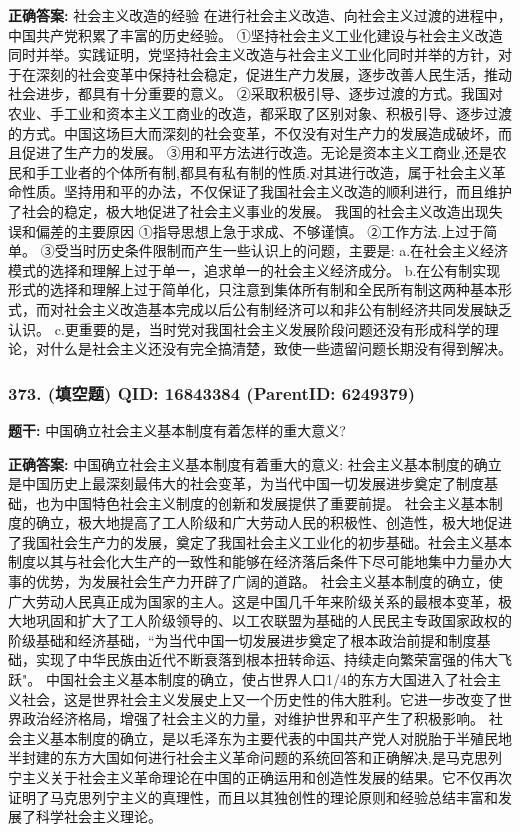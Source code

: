 \documentclass[12pt,UTF8]{ctexart}
\begin{document}
\textbf{正确答案:}
社会主义改造的经验
在进行社会主义改造、向社会主义过渡的进程中，中国共产党积累了丰富的历史经验。
①坚持社会主义工业化建设与社会主义改造同时并举。实践证明，党坚持社会主义改造与社会主义工业化同时并举的方针，对于在深刻的社会变革中保持社会稳定，促进生产力发展，逐步改善人民生活，推动社会进步，都具有十分重要的意义。
②采取积极引导、逐步过渡的方式。我国对农业、手工业和资本主义工商业的改造，都采取了区别对象、积极引导、逐步过渡的方式。中国这场巨大而深刻的社会变革，不仅没有对生产力的发展造成破坏，而且促进了生产力的发展。
③用和平方法进行改造。无论是资本主义工商业,还是农民和手工业者的个体所有制,都具有私有制的性质.对其进行改造，属于社会主义革命性质。坚持用和平的办法，不仅保证了我国社会主义改造的顺利进行，而且维护了社会的稳定，极大地促进了社会主义事业的发展。
我国的社会主义改造出现失误和偏差的主要原因
①指导思想上急于求成、不够谨慎。
②工作方法.上过于简单。
③受当时历史条件限制而产生一些认识上的问题，主要是:
a.在社会主义经济模式的选择和理解上过于单一，追求单一的社会主义经济成分。
b.在公有制实现形式的选择和理解上过于简单化，只注意到集体所有制和全民所有制这两种基本形式，而对社会主义改造基本完成以后公有制经济可以和非公有制经济共同发展缺乏认识。
c.更重要的是，当时党对我国社会主义发展阶段问题还没有形成科学的理论，对什么是社会主义还没有完全搞清楚，致使一些遗留问题长期没有得到解决。

\vspace{0.3em}\hrulefill\vspace{0.7em}

\subsubsection*{373. (填空题) \small QID: 16843384 (ParentID: 6249379)}

\textbf{题干:}
中国确立社会主义基本制度有着怎样的重大意义?



\textbf{正确答案:}
中国确立社会主义基本制度有着重大的意义:
社会主义基本制度的确立是中国历史上最深刻最伟大的社会变革，为当代中国一切发展进步奠定了制度基础，也为中国特色社会主义制度的创新和发展提供了重要前提。
社会主义基本制度的确立，极大地提高了工人阶级和广大劳动人民的积极性、创造性，极大地促进了我国社会生产力的发展，奠定了我国社会主义工业化的初步基础。社会主义基本制度以其与社会化大生产的一致性和能够在经济落后条件下尽可能地集中力量办大事的优势，为发展社会生产力开辟了广阔的道路。
社会主义基本制度的确立，使广大劳动人民真正成为国家的主人。这是中国几千年来阶级关系的最根本变革，极大地巩固和扩大了工人阶级领导的、以工农联盟为基础的人民民主专政国家政权的阶级基础和经济基础，“为当代中国一切发展进步奠定了根本政治前提和制度基础，实现了中华民族由近代不断衰落到根本扭转命运、持续走向繁荣富强的伟大飞跃"。
中国社会主义基本制度的确立，使占世界人口1/4的东方大国进入了社会主义社会，这是世界社会主义发展史上又一个历史性的伟大胜利。它进一步改变了世界政治经济格局，增强了社会主义的力量，对维护世界和平产生了积极影响。
社会主义基本制度的确立，是以毛泽东为主要代表的中国共产党人对脱胎于半殖民地半封建的东方大国如何进行社会主义革命问题的系统回答和正确解决,是马克思列宁主义关于社会主义革命理论在中国的正确运用和创造性发展的结果。它不仅再次证明了马克思列宁主义的真理性，而且以其独创性的理论原则和经验总结丰富和发展了科学社会主义理论。
\end{document}
